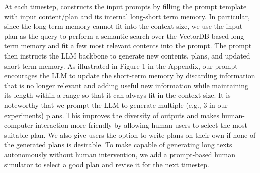 At each timestep, \baby constructs the input prompts by filling the prompt template with input content/plan and its internal long-short term memory. In particular, since the long-term memory cannot fit into the context size, we use the input plan as the query to perform a semantic search over the VectorDB-based long-term memory and fit a few most relevant contents into the prompt. The prompt then instructs the LLM backbone to generate new contents, plans, and updated short-term memory. As illustrated in Figure 1 in the Appendix, our prompt encourages the LLM to update the short-term memory by discarding information that is no longer relevant and adding useful new information while maintaining its length within a range so that it can always fit in the context size. 
It is noteworthy that we prompt the LLM to generate multiple (e.g., 3 in our experiments) plans. This improves the diversity of outputs and makes human-computer interaction more friendly by allowing human users to select the most suitable plan. We also give users the option to write plans on their own if none of the generated plans is desirable. To make \baby capable of generating long texts autonomously without human intervention, we add a prompt-based human simulator to select a good plan and revise it for the next timestep.



